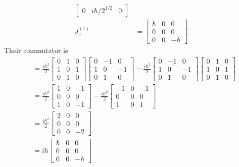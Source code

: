 \documentclass[../principles-of-quantum-mechanics.tex]{subfiles}
\begin{document}
\begin{questions}
\begin{solution}
\begin{align*}
\begin{bmatrix}
				0 & i\hbar/2^{1/2} & 0\end{bmatrix} \\
				J_z^{(1)} &= \begin{bmatrix}\hbar & 0 & 0 \\ 0 & 0 & 0 \\ 0 & 0 & -\hbar\end{bmatrix}
			\end{align*}
			Their commutator is
			\begin{align*}
				[J_x^{(1)}, J_y^{(1)}] &= \frac{i\hbar^2}{2}\begin{bmatrix}0 & 1 & 0 \\ 1 & 0 & 1 \\ 0 & 1 & 0 \end{bmatrix}\begin{bmatrix} 0 & -1 & 0 \\ 1 & 0 & -1 \\ 0 & 1 & 0 \end{bmatrix} - \frac{i\hbar^2}{2}\begin{bmatrix}0 & -1 & 0 \\ 1 & 0 & -1 \\ 0 & 1 & 0\end{bmatrix}\begin{bmatrix}0 & 1 & 0 \\ 1 & 0 & 1 \\ 0 & 1 & 0 \end{bmatrix} \\
				&= \frac{i\hbar^2}{2}\begin{bmatrix}1 & 0 & -1\\ 0 & 0 & 0\\ 1 & 0 & -1\end{bmatrix} - \frac{i\hbar^2}{2}\begin{bmatrix}-1 & 0 & -1 \\ 0 & 0 & 0\\ 1 & 0 & 1\end{bmatrix} \\
				&= \frac{i\hbar^2}{2}\begin{bmatrix}2 & 0 & 0 \\ 0 & 0 & 0 \\ 0 & 0 & -2\end{bmatrix} \\
				&= i\hbar\begin{bmatrix}\hbar & 0 & 0 \\ 0 & 0 & 0 \\ 0 & 0 & -\hbar\end{bmatrix} \\

\end{align*}
\end{solution}
\end{questions}
\end{document}
